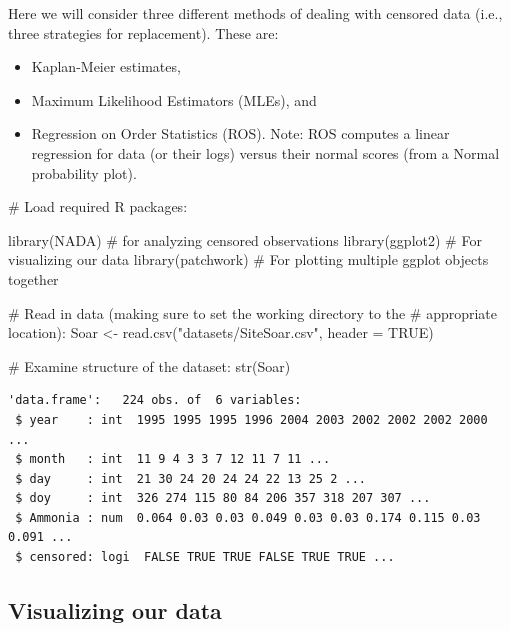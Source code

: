 \documentclass[
  letterpaper,
  DIV=11,
  numbers=noendperiod]{scrartcl}
\newenvironment{Shaded}{\begin{snugshade}}{\end{snugshade}}
\newcommand{\AttributeTok}[1]{\textcolor[rgb]{0.40,0.45,0.13}{#1}}
\newcommand{\CommentTok}[1]{\textcolor[rgb]{0.37,0.37,0.37}{#1}}
\newcommand{\ConstantTok}[1]{\textcolor[rgb]{0.56,0.35,0.01}{#1}}
\newcommand{\FunctionTok}[1]{\textcolor[rgb]{0.28,0.35,0.67}{#1}}
\newcommand{\NormalTok}[1]{\textcolor[rgb]{0.00,0.23,0.31}{#1}}
\newcommand{\OtherTok}[1]{\textcolor[rgb]{0.00,0.23,0.31}{#1}}
\newcommand{\StringTok}[1]{\textcolor[rgb]{0.13,0.47,0.30}{#1}}
\providecommand{\tightlist}{%
  \setlength{\itemsep}{0pt}\setlength{\parskip}{0pt}}\usepackage{longtable,booktabs,array}
\begin{document}
Here we will consider three different methods of dealing with censored
data (i.e., three strategies for replacement). These are:

\begin{itemize}
\tightlist
\item
  Kaplan-Meier estimates,
\item
  Maximum Likelihood Estimators (MLEs), and
\item
  Regression on Order Statistics (ROS). Note: ROS computes a linear
  regression for data (or their logs) versus their normal scores (from a
  Normal probability plot).
\end{itemize}

\begin{Shaded}
\begin{Highlighting}[]
\CommentTok{\# Load required R packages:}

\FunctionTok{library}\NormalTok{(NADA)       }\CommentTok{\# for analyzing censored observations}
\FunctionTok{library}\NormalTok{(ggplot2)    }\CommentTok{\# For visualizing our data}
\FunctionTok{library}\NormalTok{(patchwork)  }\CommentTok{\# For plotting multiple ggplot objects together}

\CommentTok{\# Read in data (making sure to set the working directory to the }
\CommentTok{\# appropriate location):}
\NormalTok{Soar }\OtherTok{\textless{}{-}} \FunctionTok{read.csv}\NormalTok{(}\StringTok{"datasets/SiteSoar.csv"}\NormalTok{, }\AttributeTok{header =} \ConstantTok{TRUE}\NormalTok{)}

\CommentTok{\# Examine structure of the dataset:}
\FunctionTok{str}\NormalTok{(Soar)}
\end{Highlighting}
\end{Shaded}

\begin{verbatim}
'data.frame':   224 obs. of  6 variables:
 $ year    : int  1995 1995 1995 1996 2004 2003 2002 2002 2002 2000 ...
 $ month   : int  11 9 4 3 3 7 12 11 7 11 ...
 $ day     : int  21 30 24 20 24 24 22 13 25 2 ...
 $ doy     : int  326 274 115 80 84 206 357 318 207 307 ...
 $ Ammonia : num  0.064 0.03 0.03 0.049 0.03 0.03 0.174 0.115 0.03 0.091 ...
 $ censored: logi  FALSE TRUE TRUE FALSE TRUE TRUE ...
\end{verbatim}

\subsection{Visualizing our data}\label{visualizing-our-data}
\end{document}
